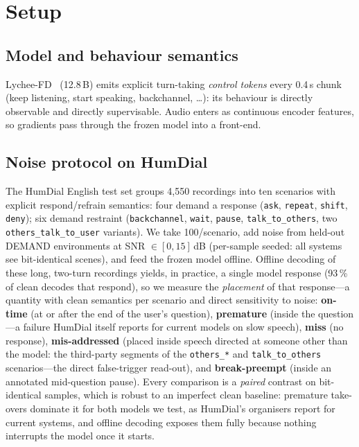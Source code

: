 \documentclass{article}
\newcommand{\lfd}{Lychee-FD}
\begin{document}
\section{Setup}
\label{sec:protocol}
\subsection{Model and behaviour semantics}
\lfd~\cite{lychee2026fd} (12.8\,B) emits explicit turn-taking \emph{control tokens} every
0.4\,s chunk (keep listening, start speaking, backchannel, \ldots): its
behaviour is directly observable and directly supervisable. Audio enters as continuous encoder
features, so gradients pass through the frozen model into a front-end.

\subsection{Noise protocol on HumDial}
The HumDial English test set groups 4{,}550 recordings into ten scenarios with explicit
respond/refrain semantics: four demand a response (\texttt{ask}, \texttt{repeat}, \texttt{shift},
\texttt{deny}); six demand restraint (\texttt{backchannel}, \texttt{wait}, \texttt{pause},
\texttt{talk\_to\_others}, two \texttt{others\_talk\_to\_user} variants). We take
100/scenario, add noise from held-out DEMAND environments at SNR
$\in[0,15]$\,dB (per-sample seeded: all systems see bit-identical scenes), and feed
the frozen model offline. Offline decoding of these long, two-turn recordings yields, in practice, a single model
response (93\,\% of clean decodes that respond), so we measure the \emph{placement} of that
response---a quantity with clean semantics per scenario and direct sensitivity to noise:
\textbf{on-time} (at or after the end of the user's question), \textbf{premature} (inside the
question---a failure HumDial itself reports for current models on slow speech), \textbf{miss}
(no response), \textbf{mis-addressed} (placed inside speech directed at someone other than the
model: the third-party segments of the \texttt{others\_*} and \texttt{talk\_to\_others}
scenarios---the direct false-trigger read-out), and \textbf{break-preempt} (inside an annotated
mid-question pause). Every comparison is a \emph{paired} contrast on bit-identical samples, which is robust to an imperfect
clean baseline: premature take-overs dominate it for both models we test, as HumDial's organisers
report for current systems, and offline decoding exposes them fully because nothing interrupts
the model once it starts.
\end{document}
